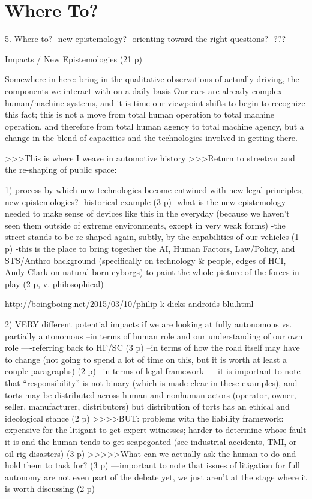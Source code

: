 \chapter{Where To?}

5. Where to?
-new epistemology?
-orienting toward the right questions?
-???

Impacts / New Epistemologies (21 p)

Somewhere in here:
bring in the qualitative observations of actually driving, the
components we interact with on a daily basis
Our cars are already complex human/machine systems, and it is time our
viewpoint shifts to begin to recognize this fact; this is not a move
from total human operation to total machine operation, and therefore
from total human agency to total machine agency, but a change in the
blend of capacities and the technologies involved in getting there.



>>>This is where I weave in automotive history 
>>>Return to streetcar and the re-shaping of public space: 

1) process by which new technologies become entwined with new legal
principles; new epistemologies?
-historical example (3 p)
-what is the new epistemology needed to make sense of devices like
this in the everyday (because we haven't seen them outside of extreme
environments, except in very weak forms)
-the street stands to be re-shaped again, subtly, by the capabilities
of our vehicles (1 p)
-this is the place to bring together the AI, Human Factors,
Law/Policy, and STS/Anthro background (specifically on technology \&
people, edges of HCI, Andy Clark on natural-born cyborgs) to paint the
whole picture of the forces in play (2 p, v. philosophical)

http://boingboing.net/2015/03/10/philip-k-dicks-androids-blu.html

2) VERY different potential impacts if we are looking at fully
autonomous vs. partially autonomous 
--in terms of human role and our understanding of our own role
----referring back to HF/SC (3 p)
--in terms of how the road itself may have to change (not going to
spend a lot of time on this, but it is worth at least a couple
paragraphs) (2 p)
--in terms of legal framework
----it is important to note that ``responsibility'' is not binary
(which is made clear in these examples), and torts may be distributed
across human and nonhuman actors (operator, owner, seller,
manufacturer, distributors) but distribution of torts has an ethical
and ideological stance (2 p)
>>>>BUT: problems with the liability framework: expensive for the
litigant to get expert witnesses; harder to determine whose fault it
is and the human tends to get scapegoated (see industrial accidents,
TMI, or oil rig disasters) (3 p)
>>>>>What can we actually ask the human to do and hold them to task
for? (3 p)
---important to note that issues of litigation for full autonomy are
not even part of the debate yet, we just aren't at the stage where it
is worth discussing (2 p)

